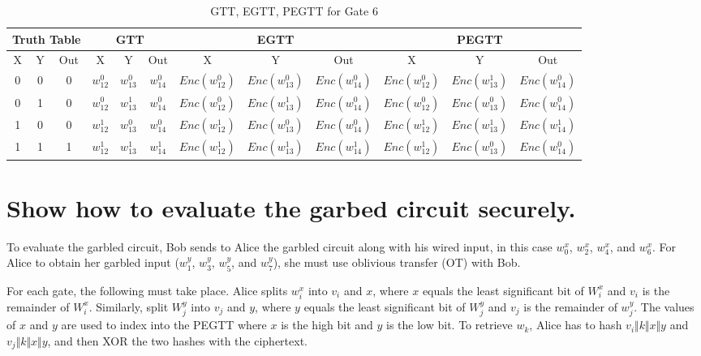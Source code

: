 \documentclass[times]{article}
\begin{document}
	\begin{table}
		\centering
		\caption{GTT, EGTT, PEGTT for Gate 6}
		\label{tab:gtt6}
		\begin{adjustbox}{width=1\textwidth}
		\begin{tabular}{|c|c|c||c|c|c||c|c|c||c|c|c|}
			\hline
			\multicolumn{3}{|c||}{Truth Table} 		& 
				\multicolumn{3}{|c||}{GTT}			& 
					\multicolumn{3}{|c||}{EGTT} 		& 
						\multicolumn{3}{|c|}{PEGTT} \\
			\hline
			\hline
			X & Y & Out	& 
				X & Y & Out	& 
					X & Y & Out	& 
						X & Y & Out	\\
			\hline
			0 & 0 & 0 	&
				$w_{12}^0$	& $w_{13}^0$	& $w_{14}^0$	& 
					$Enc(w_{12}^0)$	& $Enc(w_{13}^0)$	& $Enc(w_{14}^0)$ &
						$Enc(w_{12}^0)$	& $Enc(w_{13}^1)$	& $Enc(w_{14}^0)$ \\
			\hline
			0 & 1 & 0 	&
				$w_{12}^0$	& $w_{13}^1$	& $w_{14}^0$	& 
					$Enc(w_{12}^0)$	& $Enc(w_{13}^1)$	& $Enc(w_{14}^0)$ &
						$Enc(w_{12}^0)$	& $Enc(w_{13}^0)$	& $Enc(w_{14}^0)$ \\
			\hline
			1 & 0 & 0 	&
				$w_{12}^1$	& $w_{13}^0$	& $w_{14}^0$	& 
					$Enc(w_{12}^1)$	& $Enc(w_{13}^0)$	& $Enc(w_{14}^0)$ &
						$Enc(w_{12}^1)$	& $Enc(w_{13}^1)$	& $Enc(w_{14}^1)$ \\
			\hline
			1 & 1 & 1 	&
				$w_{12}^1$	& $w_{13}^1$	& $w_{14}^1$	& 
					$Enc(w_{12}^1)$	& $Enc(w_{13}^1)$	& $Enc(w_{14}^1)$ &
						$Enc(w_{12}^1)$	& $Enc(w_{13}^0)$	& $Enc(w_{14}^0)$ \\
			\hline
		\end{tabular}
		\end{adjustbox}
	\end{table}

	\section{Show how to evaluate the garbed circuit securely.}
	To evaluate the garbled circuit, Bob sends to Alice the garbled circuit along with his wired input, in this case $w_0^x$, $w_2^x$, $w_4^x$, and $w_6^x$. For Alice to obtain her garbled input ($w_1^y$, $w_3^y$, $w_5^y$, and $w_7^y$), she must use oblivious transfer (OT) with Bob.

	For each gate, the following must take place. Alice splits $w_i^x$ into $v_i$ and $x$, where $x$ equals the least significant bit of $W_i^x$ and $v_i$ is the remainder of $W_i^x$. Similarly, split $W_j^y$ into $v_j$ and $y$, where $y$ equals the least significant bit of $W_j^y$ and $v_j$ is the remainder of $w_j^y$. The values of $x$ and $y$ are used to index into the PEGTT where $x$ is the high bit and $y$ is the low bit. To retrieve $w_k$, Alice has to hash $v_i \Vert k \Vert x \Vert y$ and $v_j \Vert k \Vert x \Vert y$, and then XOR the two hashes with the ciphertext.
\end{document}
